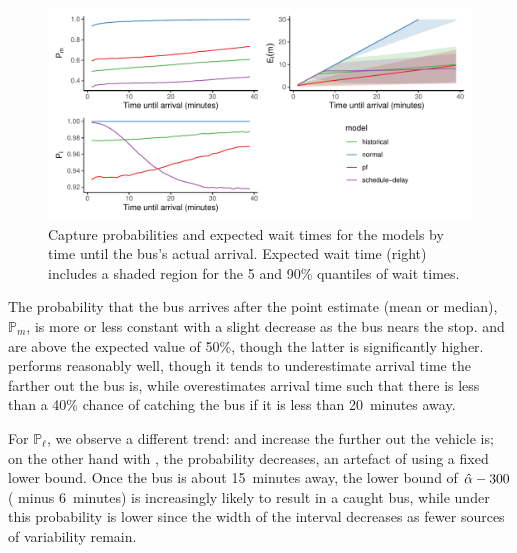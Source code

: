 \begin{knitrout}\small
{}\color{fgcolor}\begin{figure}
\includegraphics[width=\textwidth]{figure/model_results_pr_time-1} \caption[Capture probabilities and expected wait times for the models by time until the bus's actual arrival]{Capture probabilities and expected wait times for the models by time until the bus's actual arrival. Expected wait time (right) includes a shaded region for the 5 and 90\% quantiles of wait times.}\label{fig:model_results_pr_time}
\end{figure}


\end{knitrout}


The probability that the bus arrives after the point estimate (mean or median), $\mathbb{P}_m$, is more or less constant with a slight decrease as the bus nears the stop. \Fpf{} and \Fnorm{} are above the expected value of 50\%, though the latter is significantly higher. \Fnorm{} performs reasonably well, though it tends to underestimate arrival time the farther out the bus is, while \Fsched{} overestimates arrival time such that there is less than a 40\% chance of catching the bus if it is less than 20~minutes away.


For $\mathbb{P}_\ell$, we observe a different trend: \Fpf{} and \Fhist{} increase the further out the vehicle is; on the other hand with \Fsched{}, the probability decreases, an artefact of using a fixed lower bound. Once the bus is about 15~minutes away, the lower bound of \mbox{$\hat{\alpha} - 300$} (\Fsched{} minus 6~minutes) is increasingly likely to result in a caught bus, while under \Fpf{} this probability is lower since the width of the interval decreases as fewer sources of variability remain.


